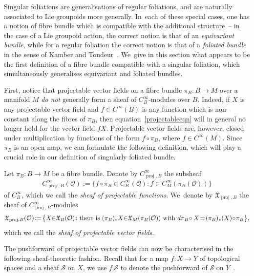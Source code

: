 \documentclass[11pt]{article}
\numberwithin{equation}{section}
\numberwithin{equation}{section}
\def\proj{\operatorname{proj}}
\def\OO{{\mathcal{O}}}
\def\SS{{\mathscr{S}}}
\def\XF{{\mathfrak{X}}}
\begin{document}
Singular foliations are generalisations of regular foliations, and are naturally associated to Lie groupoids more generally. In~each of these special cases, one has a notion of fibre bundle which is compatible with the additional structure~-- in the case of a Lie groupoid action, the correct notion is that of an \textit{equivariant bundle}, while for a regular foliation the correct notion is that of a \textit{foliated bundle} in the sense of Kamber and Tondeur~\cite{folbund}. We~give in this section what appears to be the first definition of a fibre bundle compatible with a singular foliation, which simultaneously generalises equivariant and foliated bundles.

First, notice that projectable vector fields on a fibre bundle $\pi_{B}\colon B\rightarrow M$ over a manifold $M$ \textit{do not} generally form a sheaf of $C^{\infty}_{B}$-modules over $B$. Indeed, if $X$ is any projectable vector field and $f\in C^{\infty}(B)$ is any function which is non-constant along the fibres of $\pi_{B}$, then equation~\eqref{projectableeqn} will in general no longer hold for the vector field $fX$. Projectable vector fields are, however, closed under multiplication by functions of the form $f\circ\pi_{B}$, where $f\in C^{\infty}(M)$. Since $\pi_{B}$ is an open map, we can formulate the following definition, which will play a crucial role in our definition of singularly foliated bundle.

\begin{Definition}%
Let $\pi_{B}\colon B\rightarrow M$ be a fibre bundle. Denote by $C^{\infty}_{\proj,B}$ the subsheaf
\begin{gather*}
C^{\infty}_{\proj,B}(\OO):=\big\{f\circ\pi_{B}\in C^{\infty}_{B}(\OO)\colon f\in C^{\infty}_{M}(\pi_{B}(\OO))\big\}
\end{gather*}
of $C^{\infty}_{B}$, which we call the \textit{sheaf of projectable functions}. We~denote by $\XF_{\proj,B}$ the sheaf of $C^{\infty}_{\proj,B}$-modules
\begin{gather*}
\XF_{\proj,B}(\OO)\!:=\!\big\{X{\in}\XF_{B}(\OO)\colon \text{there is $(\pi_{B})_{*}X{\in}\XF_{M}(\pi_{B}(\OO))$ with ${\rm d}\pi_{B}\!\circ X\! = \! (\pi_{B})_{*}(X)\!\circ\!\pi_{B}$}\big\},
\end{gather*}
which we call the \textit{sheaf of projectable vector fields}.
\end{Definition}

The pushforward of projectable vector fields can now be characterised in the following sheaf-theoretic fashion. Recall that for a map $f\colon X\rightarrow Y$ of topological spaces and a sheaf $\SS$ on $X$, we use $f_{!}\SS$ to denote the pushforward of $\SS$ on $Y$~\cite[p.~65]{hartshorne}.
\end{document}
